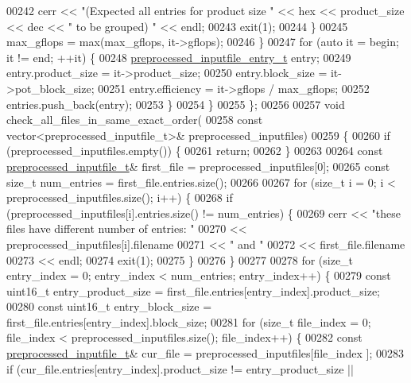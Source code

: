 \begin{DoxyCode}
{{00242         cerr << \textcolor{stringliteral}{"(Expected all entries for product size "} << hex << product\_size << dec << \textcolor{stringliteral}{" to be grouped)
      "} << endl;
00243         exit(1);
00244       \}
00245       max\_gflops = max(max\_gflops, it->gflops);
00246     \}
00247     \textcolor{keywordflow}{for} (\textcolor{keyword}{auto} it = begin; it != end; ++it) \{
00248       \hyperlink{structpreprocessed__inputfile__entry__t}{preprocessed\_inputfile\_entry\_t} entry;
00249       entry.product\_size = it->product\_size;
00250       entry.block\_size = it->pot\_block\_size;
00251       entry.efficiency = it->gflops / max\_gflops;
00252       entries.push\_back(entry);
00253     \}
00254   \}
00255 \};
00256 
00257 \textcolor{keywordtype}{void} check\_all\_files\_in\_same\_exact\_order(
00258        \textcolor{keyword}{const} vector<preprocessed\_inputfile\_t>& preprocessed\_inputfiles)
00259 \{
00260   \textcolor{keywordflow}{if} (preprocessed\_inputfiles.empty()) \{
00261     \textcolor{keywordflow}{return};
00262   \}
00263 
00264   \textcolor{keyword}{const} \hyperlink{structpreprocessed__inputfile__t}{preprocessed\_inputfile\_t}& first\_file = preprocessed\_inputfiles[0];
00265   \textcolor{keyword}{const} \textcolor{keywordtype}{size\_t} num\_entries = first\_file.entries.size();
00266 
00267   \textcolor{keywordflow}{for} (\textcolor{keywordtype}{size\_t} i = 0; i < preprocessed\_inputfiles.size(); i++) \{
00268     \textcolor{keywordflow}{if} (preprocessed\_inputfiles[i].entries.size() != num\_entries) \{
00269       cerr << \textcolor{stringliteral}{"these files have different number of entries: "}
00270            << preprocessed\_inputfiles[i].filename
00271            << \textcolor{stringliteral}{" and "}
00272            << first\_file.filename
00273            << endl;
00274       exit(1);
00275     \}
00276   \}
00277 
00278   \textcolor{keywordflow}{for} (\textcolor{keywordtype}{size\_t} entry\_index = 0; entry\_index < num\_entries; entry\_index++) \{
00279     \textcolor{keyword}{const} uint16\_t entry\_product\_size = first\_file.entries[entry\_index].product\_size;
00280     \textcolor{keyword}{const} uint16\_t entry\_block\_size = first\_file.entries[entry\_index].block\_size;
00281     \textcolor{keywordflow}{for} (\textcolor{keywordtype}{size\_t} file\_index = 0; file\_index < preprocessed\_inputfiles.size(); file\_index++) \{
00282       \textcolor{keyword}{const} \hyperlink{structpreprocessed__inputfile__t}{preprocessed\_inputfile\_t}& cur\_file = preprocessed\_inputfiles[file\_index
      ];
00283       \textcolor{keywordflow}{if} (cur\_file.entries[entry\_index].product\_size != entry\_product\_size ||
}}
\end{DoxyCode}
